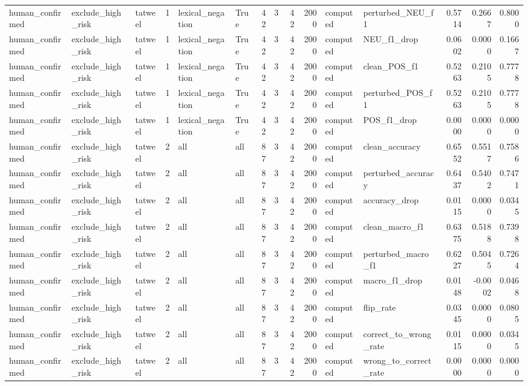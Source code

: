 \begin{tabular}{lllrllrrrrllrrr}
human_confirmed & exclude_high_risk & tatweel & 1 & lexical_negation & True & 42 & 3 & 42 & 2000 & computed & perturbed_NEU_f1 & 0.5714 & 0.2667 & 0.8000 \\
human_confirmed & exclude_high_risk & tatweel & 1 & lexical_negation & True & 42 & 3 & 42 & 2000 & computed & NEU_f1_drop & 0.0602 & 0.0000 & 0.1667 \\
human_confirmed & exclude_high_risk & tatweel & 1 & lexical_negation & True & 42 & 3 & 42 & 2000 & computed & clean_POS_f1 & 0.5263 & 0.2105 & 0.7778 \\
human_confirmed & exclude_high_risk & tatweel & 1 & lexical_negation & True & 42 & 3 & 42 & 2000 & computed & perturbed_POS_f1 & 0.5263 & 0.2105 & 0.7778 \\
human_confirmed & exclude_high_risk & tatweel & 1 & lexical_negation & True & 42 & 3 & 42 & 2000 & computed & POS_f1_drop & 0.0000 & 0.0000 & 0.0000 \\
human_confirmed & exclude_high_risk & tatweel & 2 & all & all & 87 & 3 & 42 & 2000 & computed & clean_accuracy & 0.6552 & 0.5517 & 0.7586 \\
human_confirmed & exclude_high_risk & tatweel & 2 & all & all & 87 & 3 & 42 & 2000 & computed & perturbed_accuracy & 0.6437 & 0.5402 & 0.7471 \\
human_confirmed & exclude_high_risk & tatweel & 2 & all & all & 87 & 3 & 42 & 2000 & computed & accuracy_drop & 0.0115 & 0.0000 & 0.0345 \\
human_confirmed & exclude_high_risk & tatweel & 2 & all & all & 87 & 3 & 42 & 2000 & computed & clean_macro_f1 & 0.6375 & 0.5188 & 0.7398 \\
human_confirmed & exclude_high_risk & tatweel & 2 & all & all & 87 & 3 & 42 & 2000 & computed & perturbed_macro_f1 & 0.6227 & 0.5045 & 0.7264 \\
human_confirmed & exclude_high_risk & tatweel & 2 & all & all & 87 & 3 & 42 & 2000 & computed & macro_f1_drop & 0.0148 & -0.0002 & 0.0468 \\
human_confirmed & exclude_high_risk & tatweel & 2 & all & all & 87 & 3 & 42 & 2000 & computed & flip_rate & 0.0345 & 0.0000 & 0.0805 \\
human_confirmed & exclude_high_risk & tatweel & 2 & all & all & 87 & 3 & 42 & 2000 & computed & correct_to_wrong_rate & 0.0115 & 0.0000 & 0.0345 \\
human_confirmed & exclude_high_risk & tatweel & 2 & all & all & 87 & 3 & 42 & 2000 & computed & wrong_to_correct_rate & 0.0000 & 0.0000 & 0.0000 \\

\end{tabular}
